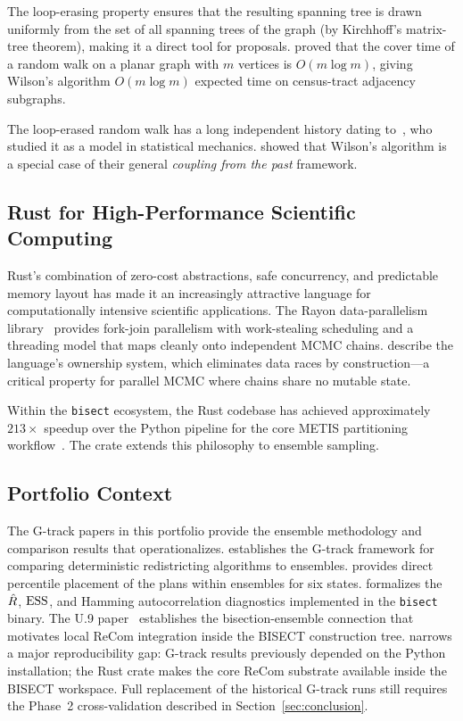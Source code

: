 The loop-erasing property ensures that the resulting spanning tree is
drawn uniformly from the set of all spanning trees of the graph (by
Kirchhoff's matrix-tree theorem), making it a direct tool for \recom{}
proposals.
\citet{aldous1991random} proved that the cover time of a random walk on
a planar graph with $m$ vertices is $O(m\log m)$, giving Wilson's
algorithm $O(m\log m)$ expected time on census-tract adjacency subgraphs.

The loop-erased random walk has a long independent history
dating to~\citet{lawler1980loop}, who studied it as a model in
statistical mechanics.
\citet{propp1998exact} showed that Wilson's algorithm is a special case
of their general \emph{coupling from the past} framework.

\subsection{Rust for High-Performance Scientific Computing}

Rust's combination of zero-cost abstractions, safe concurrency, and
predictable memory layout has made it an increasingly attractive language
for computationally intensive scientific applications.
The Rayon data-parallelism library~\citep{rayon2024} provides
fork-join parallelism with work-stealing scheduling and a threading model
that maps cleanly onto independent MCMC chains.
\citet{matsakis2014rust} describe the language's ownership system, which
eliminates data races by construction---a critical property for parallel
MCMC where chains share no mutable state.

Within the \texttt{bisect} ecosystem, the Rust codebase has achieved
approximately $213\times$ speedup over the Python pipeline for the core
METIS partitioning workflow~\citep{dellaLibera2026b1}.
The \re{} crate extends this philosophy to ensemble sampling.

\subsection{Portfolio Context}

The G-track papers in this portfolio provide the ensemble methodology and
comparison results that \re{} operationalizes.
\citet{dellaLibera2026g0} establishes the G-track framework for comparing
deterministic redistricting algorithms to \gc{} ensembles.
\citet{dellaLibera2026g1} provides direct percentile placement of the
\ar{} plans within \gc{} ensembles for six states.
\citet{dellaLibera2026g4} formalizes the $\hat{R}$, $\mathrm{ESS}$, and Hamming
autocorrelation diagnostics implemented in the \texttt{bisect} binary.
The U.9 paper~\citep{dellaLibera2026h1} establishes the bisection-ensemble
connection that motivates local ReCom integration inside the BISECT
construction tree.
\re{} narrows a major reproducibility gap: G-track results previously
depended on the Python \gc{} installation; the Rust crate makes the core
ReCom substrate available inside the BISECT workspace. Full replacement of
the historical G-track runs still requires the Phase~2 cross-validation
described in Section~\ref{sec:conclusion}.
